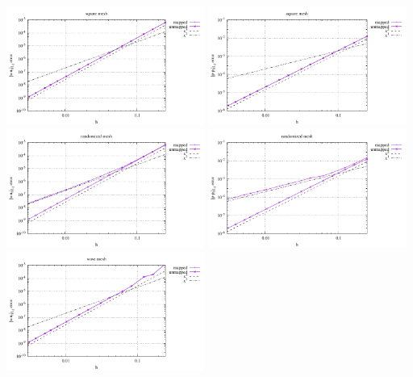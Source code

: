 \begin{center}
\includegraphics[width=6.5cm]{python_codes/fieldstone_76/results/bench9/straight/errors_V_mt1.pdf}
\includegraphics[width=6.5cm]{python_codes/fieldstone_76/results/bench9/straight/errors_P_mt1.pdf}\\
\includegraphics[width=6.5cm]{python_codes/fieldstone_76/results/bench9/straight/errors_V_mt2.pdf}
\includegraphics[width=6.5cm]{python_codes/fieldstone_76/results/bench9/straight/errors_P_mt2.pdf}\\
\includegraphics[width=6.5cm]{python_codes/fieldstone_76/results/bench9/straight/errors_V_mt3.pdf}

\end{center}
